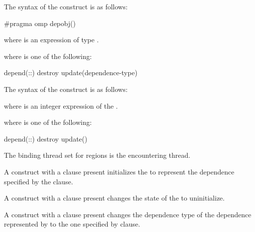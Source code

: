 \syntax

\begin{ccppspecific}
\begin{samepage}
The syntax of the  construct is as follows:

\begin{ompcPragma}
#pragma omp depobj() 
\end{ompcPragma}
\end{samepage}
where  is an expression of type .

where  is one of the following{}:

\begin{indentedcodelist}
depend(\plc{[depend-modifiers}:\plc{]dependence-type }:)
destroy
update(dependence-type)
\end{indentedcodelist}
\end{ccppspecific}

\begin{fortranspecific}
The syntax of the  construct is as follows:

\begin{ompfPragma}
!$omp depobj(\plc{depobj) \plc{clause}
\end{ompfPragma}
where  is an integer expression of the  .

where  is one of the following{}:

\begin{indentedcodelist}
depend(\plc{[depend-modifiers}:\plc{]dependence-type }:)
destroy
update()
\end{indentedcodelist}
\end{fortranspecific}

\binding

The binding thread set for  regions is the encountering thread.

\descr

A  construct with a  clause present initializes the  to represent the dependence specified by the  clause.

A  construct with a  clause present changes the state of the  to uninitialize.

A  construct with a  clause present changes the dependence type of the dependence represented by  to the one specified by  clause.

